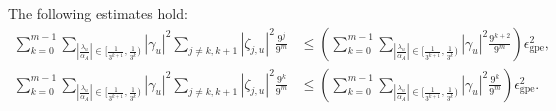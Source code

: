 \documentclass[10pt,a4paper]{amsart}
\newcommand{\abs}[1]{\left\lvert#1\right\rvert}
\begin{document}
\begin{lemma}
\label{lem:multi_lem}
The following estimates hold:
\begin{equation}
\begin{aligned}
    \sum_{k=0}^{m-1}\sum_{\abs{\frac{\lambda_u}{\alpha_A}}\in\big[\frac{1}{3^{k+1}},\frac{1}{3^k}\big)}
    \abs{\gamma_u}^2
    \sum_{j\neq k,k+1}\abs{\zeta_{j,u}}^2\frac{9^{j}}{9^m}
    &\leq\left(\sum_{k=0}^{m-1}\sum_{\abs{\frac{\lambda_u}{\alpha_A}}\in\big[\frac{1}{3^{k+1}},\frac{1}{3^k}\big)}
    \abs{\gamma_u}^2
    \frac{9^{k+2}}{9^m}\right)\epsilon_{\text{gpe}}^2,\\
    \sum_{k=0}^{m-1}\sum_{\abs{\frac{\lambda_u}{\alpha_A}}\in\big[\frac{1}{3^{k+1}},\frac{1}{3^k}\big)}
    \abs{\gamma_u}^2
    \sum_{j\neq k,k+1}\abs{\zeta_{j,u}}^2\frac{9^{k}}{9^m}
    &\leq\left(\sum_{k=0}^{m-1}\sum_{\abs{\frac{\lambda_u}{\alpha_A}}\in\big[\frac{1}{3^{k+1}},\frac{1}{3^k}\big)}
    \abs{\gamma_u}^2
    \frac{9^{k}}{9^m}\right)\epsilon_{\text{gpe}}^2.
\end{aligned}
\end{equation}
\end{lemma}
\end{document}
